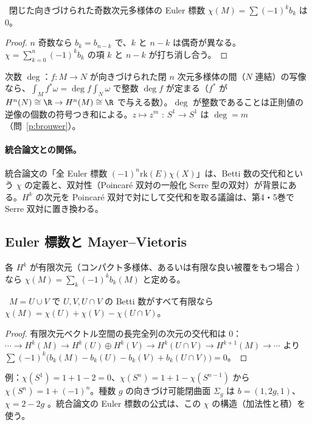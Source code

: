 \begin{cor}\label{cor:odd}\tP\
閉じた向きづけられた奇数次元多様体の Euler 標数 $\chi(M)=\sum(-1)^kb_k$ は $0$。
\end{cor}
\begin{proof}
$n$ 奇数なら $b_k=b_{n-k}$ で、$k$ と $n-k$ は偶奇が異なる。$\chi=\sum_{k=0}^n(-1)^kb_k$ の項 $k$ と $n-k$ が打ち消し合う。
\end{proof}

次数 $\deg$：$f:M\to N$ が向きづけられた閉 $n$ 次元多様体の間（$N$ 連結）の写像なら、$\int_Mf^*\omega=\deg f\int_N\omega$ で整数 $\deg f$ が定まる（$f^*$ が $H^n(N)\cong\R\to H^n(M)\cong\R$ で与える数）。$\deg$ が整数であることは正則値の逆像の個数の符号つき和による\tC。$z\mapsto z^m$ : $S^1\to S^1$ は $\deg=m$（問~\ref{p:brouwer}）。

\paragraph{統合論文との関係。}統合論文の「全 Euler 標数 $(-1)^n\mathrm{rk}(E)\chi(X)$」は、Betti 数の交代和という $\chi$ の定義と、双対性（Poincar\'e 双対の一般化 Serre 型の双対）が背景にある。$H^k$ の次元を Poincar\'e 双対で対にして交代和を取る議論は、第4・5巻で Serre 双対に置き換わる。


\subsection{Euler 標数と Mayer--Vietoris}
各 $H^k$ が有限次元（コンパクト多様体、あるいは有限な良い被覆をもつ場合 \tC）なら $\chi(M)=\sum_k(-1)^kb_k(M)$ と定める。
\begin{prop}\label{prop:chiMV}\tP\
$M=U\cup V$ で $U,V,U\cap V$ の Betti 数がすべて有限なら $\chi(M)=\chi(U)+\chi(V)-\chi(U\cap V)$。
\end{prop}
\begin{proof}
有限次元ベクトル空間の長完全列の次元の交代和は $0$：$\cdots\to H^k(M)\to H^k(U)\oplus H^k(V)\to H^k(U\cap V)\to H^{k+1}(M)\to\cdots$ より $\sum(-1)^k\bigl(b_k(M)-b_k(U)-b_k(V)+b_k(U\cap V)\bigr)=0$。
\end{proof}
例：$\chi(S^1)=1+1-2=0$、$\chi(S^n)=1+1-\chi(S^{n-1})$ から $\chi(S^n)=1+(-1)^n$。種数 $g$ の向きづけ可能閉曲面 $\Sigma_g$ は $b=(1,2g,1)$、$\chi=2-2g$ \tC。統合論文の Euler 標数の公式は、この $\chi$ の構造（加法性と積）を使う。

